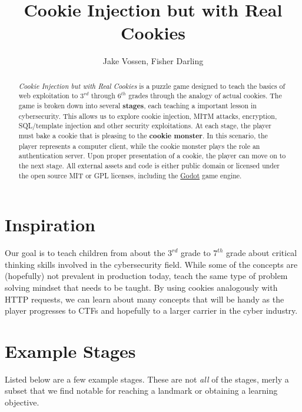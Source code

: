 \documentclass{article}
\begin{document}
\title{Cookie Injection but with Real Cookies}
\author{Jake Vossen, Fisher Darling}

\maketitle

\begin{abstract}
  
\textit{Cookie Injection but with Real Cookies} is a puzzle game
designed to teach the basics of web exploitation to $3^{rd}$ through
$6^{th}$ grades through the analogy of actual cookies. The game is
broken down into several \textbf{stages}, each teaching a important
lesson in cybersecurity. This allows us to explore cookie injection,
MITM attacks, encryption, SQL/template injection and other security
exploitations. At each stage, the player must bake a cookie that is
pleasing to the \textbf{cookie monster}. In this scenario, the player
represents a computer client, while the cookie monster plays the role
an authentication server. Upon proper presentation of a cookie, the
player can move on to the next stage. All external assets and code is
either public domain or licensed under the open source MIT or GPL
licenses, including the \href{https://godotengine.org}{Godot} game
engine.



\end{abstract}

\section{Inspiration}

Our goal is to teach children from about the $3^{rd}$ grade to
$7^{th}$ grade about critical thinking skills involved in the cybersecurity
field. While some of the concepts are (hopefully) not prevalent in
production today, teach the same type of problem solving mindset that
needs to be taught. By using cookies analogously with HTTP requests,
we can learn about many concepts that will be handy as the player
progresses to CTFs and hopefully to a larger carrier in the cyber
industry. 

\section{Example Stages}

Listed below are a few example stages. These are not \textit{all} of
the stages, merly a subset that we find notable for reaching a
landmark or obtaining a learning objective.
\end{document}
